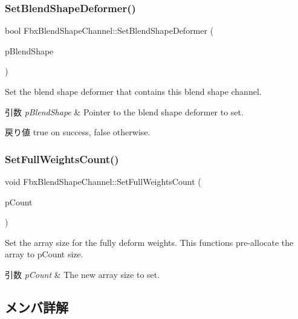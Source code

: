 \subsubsection{\texorpdfstring{Set\+Blend\+Shape\+Deformer()}{SetBlendShapeDeformer()}}
{\footnotesize\ttfamily bool Fbx\+Blend\+Shape\+Channel\+::\+Set\+Blend\+Shape\+Deformer (\begin{DoxyParamCaption}\item[{\hyperlink{class_fbx_blend_shape}{Fbx\+Blend\+Shape} $\ast$}]{p\+Blend\+Shape }\end{DoxyParamCaption})}

Set the blend shape deformer that contains this blend shape channel. 
\begin{DoxyParams}{引数}
{\em p\+Blend\+Shape} & Pointer to the blend shape deformer to set. \\
\hline
\end{DoxyParams}
\begin{DoxyReturn}{戻り値}
{\ttfamily true} on success, {\ttfamily false} otherwise. 
\end{DoxyReturn}
\mbox{\label{class_fbx_blend_shape_channel_a2e06faf81dd8983124645590f673d119}} 
\subsubsection{\texorpdfstring{Set\+Full\+Weights\+Count()}{SetFullWeightsCount()}}
{\footnotesize\ttfamily void Fbx\+Blend\+Shape\+Channel\+::\+Set\+Full\+Weights\+Count (\begin{DoxyParamCaption}\item[{int}]{p\+Count }\end{DoxyParamCaption})}

Set the array size for the fully deform weights. This functions pre-\/allocate the array to p\+Count size. 
\begin{DoxyParams}{引数}
{\em p\+Count} & The new array size to set. \\
\hline
\end{DoxyParams}


\subsection{メンバ詳解}
\mbox{\label{class_fbx_blend_shape_channel_a7b6c288c4f2d70fed6f29b424d7020a4}} 
